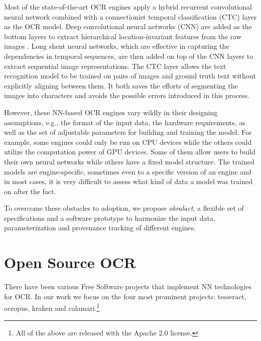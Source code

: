 \documentclass[conference]{IEEEtran}
\begin{document}
Most of the state-of-the-art OCR engines apply a hybrid recurrent convolutional neural network combined with a connectionist temporal classification (CTC) \cite{graves2006connectionist} layer as the OCR model. Deep convolutional neural networks (CNN) \cite{krizhevsky2012imagenet} are added as the bottom layers to extract hierarchical location-invariant features from the raw images \cite{wick2018improving}. Long shent neural networks, which are effective in capturing the dependencies in temporal sequences, are then added on top of the CNN layers to extract sequential image representations. The CTC layer allows the text recognition model to be trained on pairs of images and ground truth text without explicitly aligning between them. It both saves the efforts of segmenting the images into characters and avoids the possible errors introduced in this process. 

However, these NN-based OCR engines vary wildly in their designing assumptions, e.g., the format of the input data, the hardware requirements, as well as the set of adjustable parameters for building and training the model. For example, some engines could only be run on CPU devices while the others could utilize the computation power of GPU devices. Some of them allow users to build their own neural networks while others have a fixed model structure. The trained models are engine-specific, sometimes even to a specific version of an engine and in most cases, it is very difficult to assess what kind of data a model was trained on after the fact.

% 

To overcome these obstacles to adoption, we propose \textit{okralact}, a flexible set of specifications
and a software prototype to harmonize the input data, parameterization and provenance
tracking of different engines. 

\section*{Open Source OCR}

There have been various Free Software projects that implement NN technologies
for OCR. In our work we focus on the four most prominent projects: tesseract, ocropus,
kraken and calamari.\footnote{All of the above are released with the Apache 2.0 license.}
\end{document}
